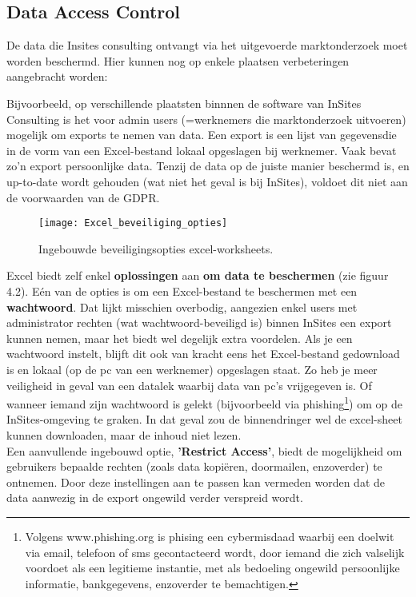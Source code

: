 \subsection{Data Access Control}
De data die Insites consulting ontvangt via het uitgevoerde marktonderzoek moet worden beschermd. Hier kunnen nog op enkele plaatsen verbeteringen aangebracht worden: 

Bijvoorbeeld, op verschillende plaatsten binnnen de software van InSites Consulting is het voor admin users (=werknemers die marktonderzoek uitvoeren) mogelijk om exports te nemen van data. Een export is een lijst van gegevensdie in de vorm van een Excel-bestand lokaal opgeslagen bij werknemer.
Vaak bevat zo'n export persoonlijke data. Tenzij de data op de juiste manier beschermd is, en up-to-date wordt gehouden (wat niet het geval is bij InSites), voldoet dit niet aan de voorwaarden van de GDPR. 

\begin{figure}[h]
	\centering
	\texttt{[image: Excel\_beveiliging\_opties]}
	\label{fig:excelbeveiliging}
	\caption{Ingebouwde beveiligingsopties excel-worksheets.}
\end{figure}


Excel biedt zelf enkel \textbf{oplossingen} aan \textbf{om data te beschermen} (zie figuur 4.2). Eén van de opties is om een Excel-bestand te beschermen met een \textbf{wachtwoord}. Dat lijkt misschien overbodig, aangezien enkel users met administrator rechten (wat wachtwoord-beveiligd is) binnen InSites een export kunnen nemen, maar het biedt wel degelijk extra voordelen. Als je een wachtwoord instelt, blijft dit ook van kracht eens het Excel-bestand gedownload is en lokaal (op de pc van een werknemer) opgeslagen staat. Zo heb je meer veiligheid in geval van een datalek waarbij data van pc's vrijgegeven is. Of wanneer iemand zijn wachtwoord is gelekt (bijvoorbeeld via phishing\footnote{Volgens www.phishing.org is phising een cybermisdaad waarbij een doelwit via email, telefoon of sms gecontacteerd wordt, door iemand die zich valselijk voordoet als een legitieme instantie, met als bedoeling ongewild persoonlijke informatie, bankgegevens, enzoverder te bemachtigen.}) om op de InSites-omgeving te graken. In dat geval zou de binnendringer wel de excel-sheet kunnen downloaden, maar de inhoud niet lezen. \\

Een aanvullende ingebouwd optie, \textbf{'Restrict Access'}, biedt de mogelijkheid om gebruikers bepaalde rechten (zoals data kopiëren, doormailen, enzoverder) te ontnemen. Door deze instellingen aan te passen kan vermeden worden dat de data aanwezig in de export ongewild verder verspreid wordt. 


